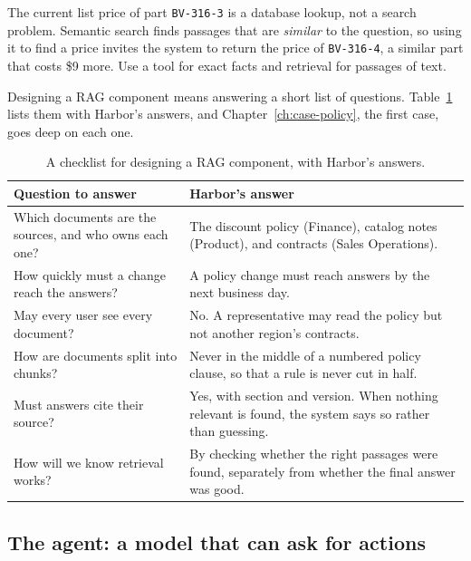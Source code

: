 \begin{watchout}
The current list price of part \texttt{BV-316-3} is a database lookup, not a search problem. Semantic search finds passages that are \emph{similar} to the question, so using it to find a price invites the system to return the price of \texttt{BV-316-4}, a similar part that costs \$9 more. Use a tool for exact facts and retrieval for passages of text.
\end{watchout}

Designing a RAG component means answering a short list of questions. Table~\ref{tab:rag-checklist} lists them with Harbor's answers, and Chapter~\ref{ch:case-policy}, the first case, goes deep on each one.

\begin{table}[htbp]
\centering
\small
\caption{A checklist for designing a RAG component, with Harbor's answers.}
\label{tab:rag-checklist}
\begin{tabularx}{\textwidth}{@{}>{\raggedright\arraybackslash}p{5.2cm}>{\raggedright\arraybackslash}X@{}}
\toprule
\rowcolor{coAmberBg} Question to answer & Harbor's answer \\
\midrule
Which documents are the sources, and who owns each one? & The discount policy (Finance), catalog notes (Product), and contracts (Sales Operations). \\
How quickly must a change reach the answers? & A policy change must reach answers by the next business day. \\
May every user see every document? & No. A representative may read the policy but not another region's contracts. \\
How are documents split into chunks? & Never in the middle of a numbered policy clause, so that a rule is never cut in half. \\
Must answers cite their source? & Yes, with section and version. When nothing relevant is found, the system says so rather than guessing. \\
How will we know retrieval works? & By checking whether the right passages were found, separately from whether the final answer was good. \\
\bottomrule
\end{tabularx}
\end{table}

\subsection{The agent: a model that can ask for actions}
\label{sec:block-agent}

